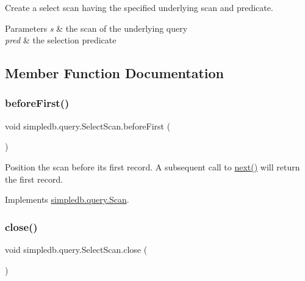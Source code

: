 Create a select scan having the specified underlying scan and predicate. 
\begin{DoxyParams}{Parameters}
{\em s} & the scan of the underlying query \\
\hline
{\em pred} & the selection predicate \\
\hline
\end{DoxyParams}


\subsection{Member Function Documentation}
\mbox{\label{classsimpledb_1_1query_1_1SelectScan_a5ba571c7504c39532b8a211f804e1726}} 
\subsubsection{\texorpdfstring{before\+First()}{beforeFirst()}}
{\footnotesize\ttfamily void simpledb.\+query.\+Select\+Scan.\+before\+First (\begin{DoxyParamCaption}{ }\end{DoxyParamCaption})\hspace{0.3cm}{\ttfamily [inline]}}

Position the scan before its first record. A subsequent call to \hyperlink{classsimpledb_1_1query_1_1SelectScan_aefb8c0f74e03179755553ce178f7504d}{next()} will return the first record. 

Implements \hyperlink{interfacesimpledb_1_1query_1_1Scan_a2eceb634b69da9bf1269a4355808cc6b}{simpledb.\+query.\+Scan}.

\mbox{\label{classsimpledb_1_1query_1_1SelectScan_a5baa8036fe4b4ab88760ce5cad67e7ec}} 
\subsubsection{\texorpdfstring{close()}{close()}}
{\footnotesize\ttfamily void simpledb.\+query.\+Select\+Scan.\+close (\begin{DoxyParamCaption}{ }\end{DoxyParamCaption})\hspace{0.3cm}{\ttfamily [inline]}}


